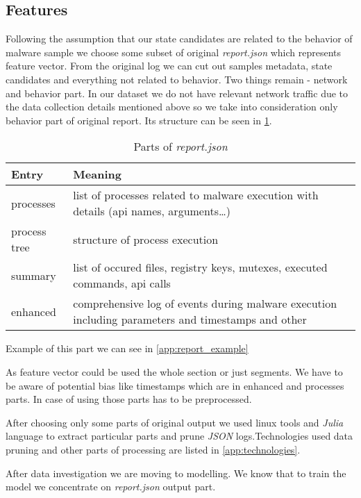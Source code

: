 \subsection{Features}
Following the assumption that our state candidates are related to the behavior of malware sample we choose some subset of original \emph{report.json} which represents feature vector. From the original log we can cut out samples metadata, state candidates and everything not related to behavior. Two things remain - network and behavior part. In our dataset we do not have relevant network traffic due to the data collection details mentioned above so we take into consideration only behavior part of original report. Its structure can be seen in \ref{tab:behavioral}.

\begin{table}[h]
    \centering
    \caption{Parts of \emph{report.json}}
    \begin{tabular}{p{2cm}p{12cm}} 
        \toprule
        \textbf{Entry} &
        \textbf{Meaning} \\
        \midrule
        processes & list of processes related to malware execution with details (api names, arguments\dots) \\
        \midrule
        process tree & structure of process execution\\
        \midrule
        summary & list of occured files, registry keys, mutexes, executed commands, api calls \\
        \midrule
        enhanced & comprehensive log of events during malware execution including parameters and timestamps and other\\
        \bottomrule
    \end{tabular}
    \label{tab:behavioral}
\end{table}
Example of this part we can see in \ref{app:report_example}

As feature vector could be used the whole section or just segments. We have to be aware of potential bias like timestamps which are in enhanced and processes parts. In case of using those parts has to be preprocessed.

After choosing only some parts of original output we used linux tools and \emph{Julia} language to extract particular parts and prune \emph{JSON} logs.Technologies used data pruning and other parts of processing are listed in \ref{app:technologies}.


After data investigation we are moving to modelling. We know that to train the model we concentrate on \emph{report.json} output part.





